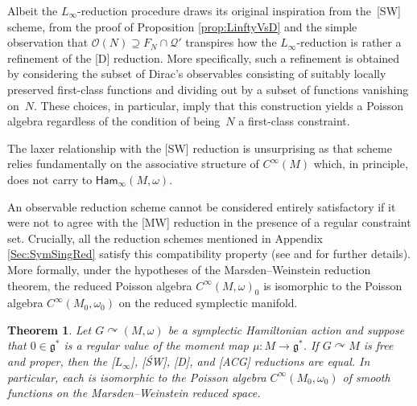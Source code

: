\documentclass[pdftex]{sigma}
\numberwithin{equation}{section}
\newtheorem{Theorem}{Theorem}[section]
\DeclareMathOperator{\action}{\curvearrowright}
\newcommand{\g}{\mathfrak{g}}
\newcommand{\Ham}{\mathsf{Ham}}
\renewcommand{\supset}{\supseteq}
\begin{document}
\begin{Remark}
Albeit the $L_\infty$-reduction procedure draws its original inspiration from the~[SW] scheme, from the proof of Proposition \ref{prop:LinftyVsD} and the simple observation that $\mathcal{O}(N)\supset F_N\cap\mathcal{Q}'$ transpires how the $L_\infty$-reduction is rather a refinement of the [D] reduction.
More specifically, such a refinement is obtained by considering the subset of Dirac's observables consisting of suitably locally preserved first-class functions and dividing out by a subset of functions vanishing on~$N$. These choices, in particular, imply that this construction yields a Poisson algebra regardless of the condition of being~$N$ a first-class constraint.

The laxer relationship with the [SW] reduction is unsurprising as that scheme relies fundamentally on the associative structure of $C^\infty(M)$ which, in principle, does not carry to $\Ham_\infty(M,\omega)$.
\end{Remark}

An observable reduction scheme cannot be considered entirely satisfactory if it were not to agree with the [MW] reduction in the presence of a regular constraint set.
Crucially, all the reduction schemes mentioned in Appendix \ref{Sec:SymSingRed} satisfy this compatibility property (see \cite[Theorem~1]{SniatyckiWeinstein83} and \cite[Proposition~3.6]{ArmsGotayJennings90} for further details).
%
More formally, under the hypotheses of the Marsden--Weinstein reduction theorem, the reduced Poisson algebra $C^\infty(M,\omega)_0$ is isomorphic to the Poisson algebra $C^\infty(M_0,\omega_0)$ on the reduced symplectic manifold.

\begin{Theorem}\label{thm:AllReductionsComparison-sympleticcase}
	Let $G\action (M,\omega)$ be a symplectic Hamiltonian action and suppose that $0\in\g^*$ is a regular value of the moment map $\mu\colon M\to\g^*$.
	If $G\curvearrowright M$ is free and proper, then the {\rm [$L_\infty$]}, {\rm [\'SW]}, {\rm [D]}, and {\rm [ACG]} reductions are equal.
	In particular, each is isomorphic to the Poisson algebra $C^\infty(M_0,\omega_0)$ of smooth functions on the Marsden--Weinstein reduced space.
\end{Theorem}
\end{document}
